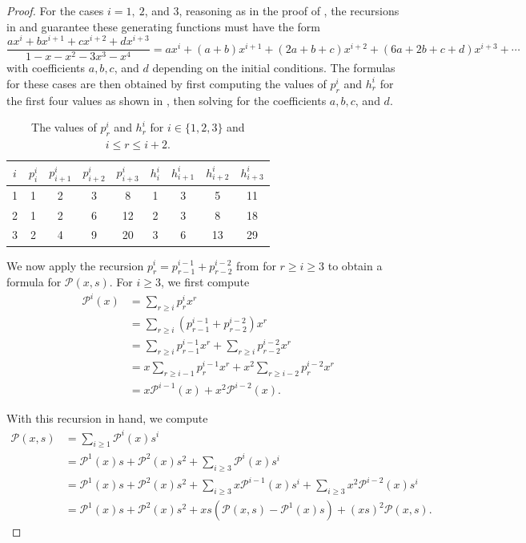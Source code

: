 \documentclass{amsart}
\theoremstyle{definition}
\newcommand{\calP}{\mathcal{P}}
\begin{document}
\begin{proof}
For the cases $i=1,~2$, and $3$, reasoning as in the proof of ,  the recursions in  and  guarantee these generating functions must have the form \[\frac{ax^i+bx^{i+1}+cx^{i+2}+dx^{i+3}}{1-x-x^2-3x^3-x^4}=ax^i+(a+b)x^{i+1}+(2a+b+c)x^{i+2}+(6a+2b+c+d)x^{i+3}+\cdots\] with coefficients $a,b,c$, and $d$ depending on the initial conditions. 
The formulas for these cases are then obtained by first computing the values of $p^i_r$ and $h^i_r$ for the first four values as shown in , then solving for the coefficients $a,b,c$, and $d$. 

\begin{table}[]
    \centering
    \begin{tabular}{c||c|c|c|c||c|c|c|c}
        $i$ & $p^i_{i}$ & $p^i_{i+1}$ & $p^i_{i+2}$ & $p^i_{i+3}$ & $h^i_{i}$ & $h^i_{i+1}$ & $h^i_{i+2}$ & $h^i_{i+3}$ \\ \hline
         1 & 1 & 2 & 3 & 8 & 1 & 3 & 5 & 11\\
         2 & 1 & 2 & 6 & 12 & 2 & 3 & 8 & 18\\
         3 & 2 & 4 & 9 & 20 & 3 & 6 & 13 & 29
    \end{tabular}
    \caption{The values of $p^i_r$ and $h^i_r$ for $i\in\{1,2,3\}$ and $i\leq r\leq i+2$.}
    \label{tab:initial_values_p_h}
\end{table}

We now apply the recursion $p^i_r=p^{i-1}_{r-1}+p^{i-2}_{r-2}$ from  for $r\geq i\geq 3$ to obtain a formula for $\calP(x,s)$. 
For $i\geq 3$, we first compute\begin{align*}
    \calP^i(x)&=\sum_{r\geq i}p_r^i x^r\\
    &=\sum_{r\geq i} (p_{r-1}^{i-1}+p_{r-2}^{i-2})x^r\\
    &=\sum_{r\geq i}p_{r-1}^{i-1}x^r+\sum_{r\geq i}p_{r-2}^{i-2}x^r\\
    &=x\sum_{r\geq i-1}p_r^{i-1}x^r+x^2\sum_{r\geq i-2}p_r^{i-2}x^r\\
    &=x\calP^{i-1}(x)+x^2\calP^{i-2}(x).
\end{align*}

With this recursion in hand, we compute \begin{align*}
    \calP(x,s)&=\sum_{i\geq 1}\calP^i(x)s^i\\
    &=\calP^1(x)s+\calP^2(x)s^2+\sum_{i\geq 3} \calP^i(x)s^i\\
    &=\calP^1(x)s+\calP^2(x)s^2+\sum_{i\geq3}x\calP^{i-1}(x)s^i+\sum_{i\geq3}x^2\calP^{i-2}(x)s^i\\
    &=\calP^1(x)s+\calP^2(x)s^2+xs(\calP(x,s)-\calP^1(x)s)+(xs)^2\calP(x,s).
\end{align*}


\end{proof}
\end{document}
